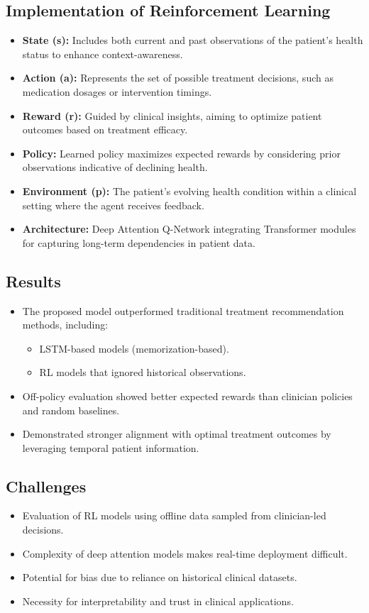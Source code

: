 \subsection*{Implementation of Reinforcement Learning}
\begin{itemize}
    \item \textbf{State (s):} Includes both current and past observations of the patient's health status to enhance context-awareness.
    \item \textbf{Action (a):} Represents the set of possible treatment decisions, such as medication dosages or intervention timings.
    \item \textbf{Reward (r):} Guided by clinical insights, aiming to optimize patient outcomes based on treatment efficacy.
    \item \textbf{Policy:} Learned policy maximizes expected rewards by considering prior observations indicative of declining health.
    \item \textbf{Environment (p):} The patient's evolving health condition within a clinical setting where the agent receives feedback.
    \item \textbf{Architecture:} Deep Attention Q-Network integrating Transformer modules for capturing long-term dependencies in patient data.
\end{itemize}

\subsection*{Results}
\begin{itemize}
    \item The proposed model outperformed traditional treatment recommendation methods, including:
    \begin{itemize}
        \item LSTM-based models (memorization-based).
        \item RL models that ignored historical observations.
    \end{itemize}
    \item Off-policy evaluation showed better expected rewards than clinician policies and random baselines.
    \item Demonstrated stronger alignment with optimal treatment outcomes by leveraging temporal patient information.
\end{itemize}

\subsection*{Challenges}
\begin{itemize}
    \item Evaluation of RL models using offline data sampled from clinician-led decisions.
    \item Complexity of deep attention models makes real-time deployment difficult.
    \item Potential for bias due to reliance on historical clinical datasets.
    \item Necessity for interpretability and trust in clinical applications.
\end{itemize}

